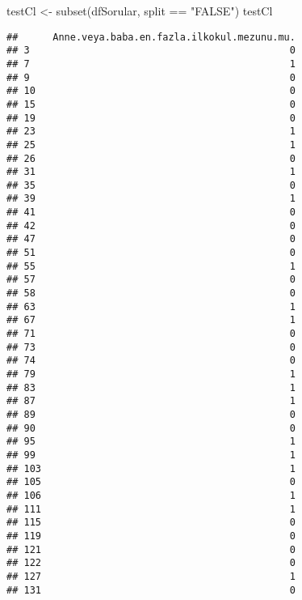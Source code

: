 \documentclass[
]{article}
\newenvironment{Shaded}{\begin{snugshade}}{\end{snugshade}}
\newcommand{\FunctionTok}[1]{\textcolor[rgb]{0.00,0.00,0.00}{#1}}
\newcommand{\NormalTok}[1]{#1}
\newcommand{\OtherTok}[1]{\textcolor[rgb]{0.56,0.35,0.01}{#1}}
\newcommand{\SpecialCharTok}[1]{\textcolor[rgb]{0.00,0.00,0.00}{#1}}
\newcommand{\StringTok}[1]{\textcolor[rgb]{0.31,0.60,0.02}{#1}}
\begin{document}
\begin{Shaded}
\begin{Highlighting}[]
\NormalTok{testCl }\OtherTok{\textless{}{-}} \FunctionTok{subset}\NormalTok{(dfSorular, split }\SpecialCharTok{==} \StringTok{"FALSE"}\NormalTok{)}
\NormalTok{testCl}
\end{Highlighting}
\end{Shaded}

\begin{verbatim}
##      Anne.veya.baba.en.fazla.ilkokul.mezunu.mu.
## 3                                             0
## 7                                             1
## 9                                             0
## 10                                            0
## 15                                            0
## 19                                            0
## 23                                            1
## 25                                            1
## 26                                            0
## 31                                            1
## 35                                            0
## 39                                            1
## 41                                            0
## 42                                            0
## 47                                            0
## 51                                            0
## 55                                            1
## 57                                            0
## 58                                            0
## 63                                            1
## 67                                            1
## 71                                            0
## 73                                            0
## 74                                            0
## 79                                            1
## 83                                            1
## 87                                            1
## 89                                            0
## 90                                            0
## 95                                            1
## 99                                            1
## 103                                           1
## 105                                           0
## 106                                           1
## 111                                           1
## 115                                           0
## 119                                           0
## 121                                           0
## 122                                           0
## 127                                           1
## 131                                           0

\end{verbatim}
\end{document}
